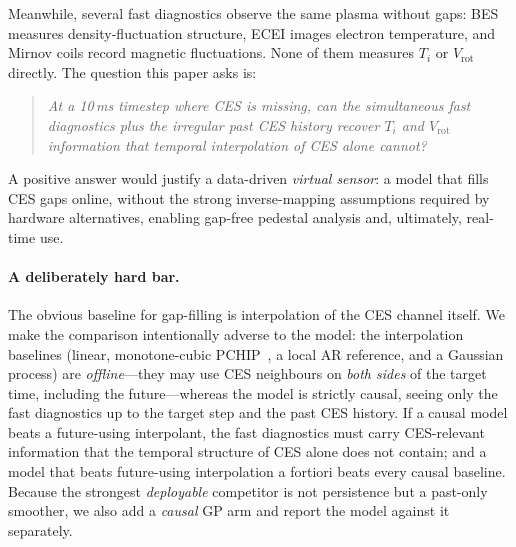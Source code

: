 \documentclass[10pt]{article}
\newcommand{\Ti}{\ensuremath{T_i}}
\newcommand{\Vrot}{\ensuremath{V_\mathrm{rot}}}
\begin{document}
Meanwhile, several fast diagnostics observe the same plasma without gaps: BES
measures density-fluctuation structure, ECEI images electron temperature, and
Mirnov coils record magnetic fluctuations. None of them measures \Ti{} or \Vrot{}
directly. The question this paper asks is:

\begin{quote}
\emph{At a 10\,ms timestep where CES is missing, can the simultaneous fast
diagnostics plus the irregular past CES history recover \Ti{} and \Vrot{}
information that temporal interpolation of CES alone cannot?}
\end{quote}

A positive answer would justify a data-driven \emph{virtual sensor}: a model that
fills CES gaps online, without the strong inverse-mapping assumptions required by
hardware alternatives, enabling gap-free pedestal analysis and, ultimately,
real-time use.

\paragraph{A deliberately hard bar.}
The obvious baseline for gap-filling is interpolation of the CES channel itself.
We make the comparison intentionally adverse to the model: the interpolation
baselines (linear, monotone-cubic PCHIP~\citep{fritsch1980}, a local AR
reference, and a Gaussian process) are \emph{offline}---they may use CES neighbours
on \emph{both sides} of the target time, including the future---whereas the model
is strictly causal, seeing only the fast diagnostics up to the target step and the
past CES history. If a causal model beats a future-using interpolant, the fast
diagnostics must carry CES-relevant information that the temporal structure of CES
alone does not contain; and a model that beats future-using interpolation a
fortiori beats every causal baseline. Because the strongest \emph{deployable}
competitor is not persistence but a past-only smoother, we also add a \emph{causal}
GP arm and report the model against it separately.
\end{document}
